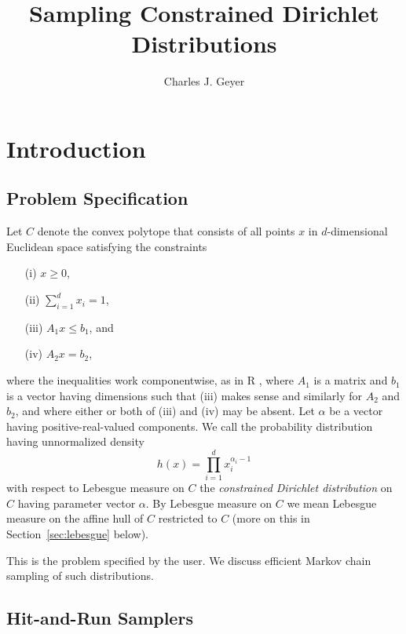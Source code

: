 \documentclass[11pt]{article}
\begin{document}
\title{Sampling Constrained Dirichlet Distributions}

\author{Charles J. Geyer}

\maketitle

\section{Introduction}

\subsection{Problem Specification} \label{sec:specification}

Let $C$ denote the convex polytope that consists of all points $x$ in
$d$-dimensional Euclidean space satisfying the constraints
\begin{enumerate}
\item[(i)] $x \ge 0$,
\item[(ii)] $\sum_{i = 1}^d x_i = 1$,
\item[(iii)] $A_1 x \le b_1$, and
\item[(iv)] $A_2 x = b_2$,
\end{enumerate}
where the inequalities work componentwise, as in R \citep{r},
where $A_1$ is a matrix
and $b_1$ is a vector having dimensions such that (iii) makes sense and
similarly for $A_2$ and $b_2$, and where either or both of (iii) and (iv)
may be absent.  Let $\alpha$ be a vector having positive-real-valued
components.  We call the probability distribution having unnormalized density
\begin{equation} \label{eq:unnormalized-density}
   h(x) = \prod_{i = 1}^d x_i^{\alpha_i - 1}
\end{equation}
with respect to Lebesgue measure on $C$ the \emph{constrained Dirichlet
distribution} on $C$ having parameter vector $\alpha$.
By Lebesgue measure on $C$ we mean Lebesgue measure on the affine hull
of $C$ restricted to $C$ (more on this in Section~\ref{sec:lebesgue} below).

This is the problem specified by the user.
We discuss efficient Markov chain sampling of such distributions.

\subsection{Hit-and-Run Samplers}
\end{document}
